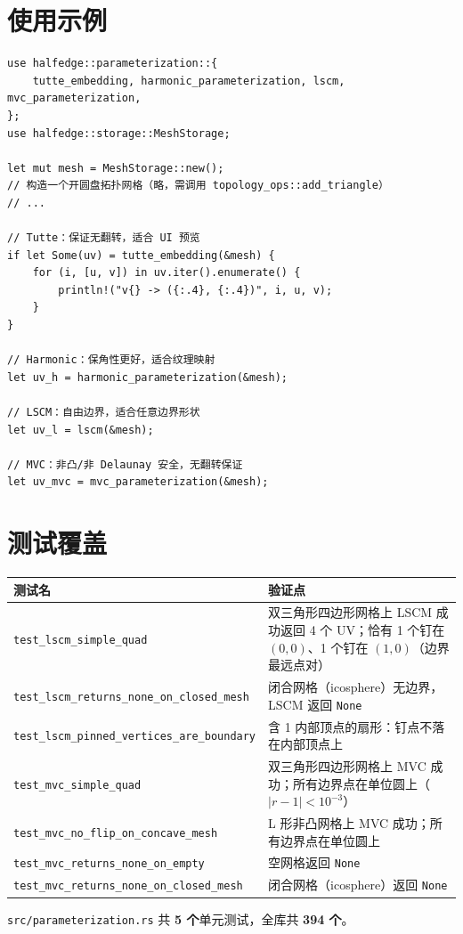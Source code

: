 \documentclass[11pt,a4paper]{article}
\begin{document}
\section{使用示例}

\begin{lstlisting}
use halfedge::parameterization::{
    tutte_embedding, harmonic_parameterization, lscm, mvc_parameterization,
};
use halfedge::storage::MeshStorage;

let mut mesh = MeshStorage::new();
// 构造一个开圆盘拓扑网格（略，需调用 topology_ops::add_triangle）
// ...

// Tutte：保证无翻转，适合 UI 预览
if let Some(uv) = tutte_embedding(&mesh) {
    for (i, [u, v]) in uv.iter().enumerate() {
        println!("v{} -> ({:.4}, {:.4})", i, u, v);
    }
}

// Harmonic：保角性更好，适合纹理映射
let uv_h = harmonic_parameterization(&mesh);

// LSCM：自由边界，适合任意边界形状
let uv_l = lscm(&mesh);

// MVC：非凸/非 Delaunay 安全，无翻转保证
let uv_mvc = mvc_parameterization(&mesh);
\end{lstlisting}

\section{测试覆盖}

\begin{center}
\renewcommand{\arraystretch}{1.18}
\begin{tabular}{@{}p{6.2cm}p{8.5cm}@{}}
  \toprule
  \textbf{测试名} & \textbf{验证点} \\
  \midrule
  \texttt{test\_lscm\_simple\_quad}
    & 双三角形四边形网格上 LSCM 成功返回 4 个 UV；恰有 1 个钉在 $(0,0)$、1 个钉在 $(1,0)$（边界最远点对） \\
  \texttt{test\_lscm\_returns\_none\_on\_closed\_mesh}
    & 闭合网格（icosphere）无边界，LSCM 返回 \texttt{None} \\
  \texttt{test\_lscm\_pinned\_vertices\_are\_boundary}
    & 含 1 内部顶点的扇形：钉点不落在内部顶点上 \\
  \midrule
  \texttt{test\_mvc\_simple\_quad}
    & 双三角形四边形网格上 MVC 成功；所有边界点在单位圆上（$|r - 1| < 10^{-3}$） \\
  \texttt{test\_mvc\_no\_flip\_on\_concave\_mesh}
    & L 形非凸网格上 MVC 成功；所有边界点在单位圆上 \\
  \texttt{test\_mvc\_returns\_none\_on\_empty}
    & 空网格返回 \texttt{None} \\
  \texttt{test\_mvc\_returns\_none\_on\_closed\_mesh}
    & 闭合网格（icosphere）返回 \texttt{None} \\
  \bottomrule
\end{tabular}
\end{center}

\texttt{src/parameterization.rs} 共 \textbf{5 个}单元测试，全库共 \textbf{394 个}。
\end{document}
